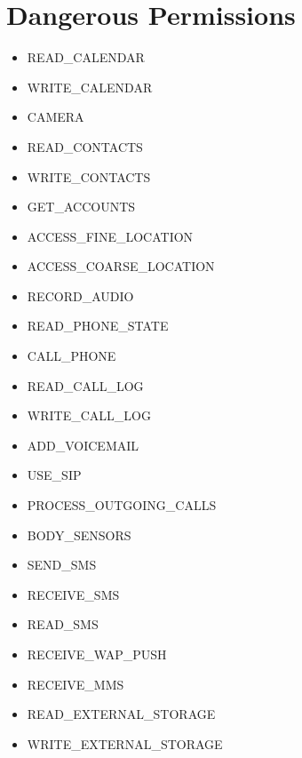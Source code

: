\section*{Dangerous Permissions}
\begin{itemize}
\item[] READ\_CALENDAR
\item[] WRITE\_CALENDAR
\item[] CAMERA
\item[] READ\_CONTACTS
\item[] WRITE\_CONTACTS
\item[] GET\_ACCOUNTS
\item[] ACCESS\_FINE\_LOCATION
\item[] ACCESS\_COARSE\_LOCATION
\item[] RECORD\_AUDIO
\item[] READ\_PHONE\_STATE
\item[] CALL\_PHONE
\item[] READ\_CALL\_LOG
\item[] WRITE\_CALL\_LOG
\item[] ADD\_VOICEMAIL
\item[] USE\_SIP
\item[] PROCESS\_OUTGOING\_CALLS
\item[] BODY\_SENSORS
\item[] SEND\_SMS
\item[] RECEIVE\_SMS
\item[] READ\_SMS
\item[] RECEIVE\_WAP\_PUSH
\item[] RECEIVE\_MMS
\item[] READ\_EXTERNAL\_STORAGE
\item[] WRITE\_EXTERNAL\_STORAGE
\end{itemize}





